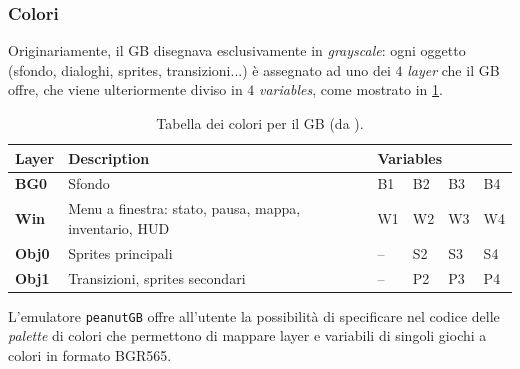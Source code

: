 \documentclass[hidelinks,12pt]{article}
\begin{document}
\subsubsection{Colori}
Originariamente, il GB disegnava esclusivamente in \textit{grayscale}: ogni
oggetto (sfondo, dialoghi, sprites, transizioni...) è assegnato ad uno dei $4$
\textit{layer} che il GB offre, che viene ulteriormente diviso in $4$
\textit{variables}, come mostrato in \cref{table:gb_colors}.
\begin{table}[h]
	\begin{tabular}{|l|l|llll|}
		\hline
		\textbf{Layer} & \textbf{Description}                                  & \multicolumn{4}{l|}{\textbf{Variables}}                                                          \\ \hline
		\textbf{BG0}   & Sfondo                                                & \multicolumn{1}{l|}{B1}                 & \multicolumn{1}{l|}{B2} & \multicolumn{1}{l|}{B3} & B4 \\ \hline
		\textbf{Win}   & Menu a finestra: stato, pausa, mappa, inventario, HUD & \multicolumn{1}{l|}{W1}                 & \multicolumn{1}{l|}{W2} & \multicolumn{1}{l|}{W3} & W4 \\ \hline
		\textbf{Obj0}  & Sprites principali                                    & \multicolumn{1}{l|}{–}                  & \multicolumn{1}{l|}{S2} & \multicolumn{1}{l|}{S3} & S4 \\ \hline
		\textbf{Obj1}  & Transizioni, sprites secondari                        & \multicolumn{1}{l|}{–}                  & \multicolumn{1}{l|}{P2} & \multicolumn{1}{l|}{P3} & P4 \\ \hline
	\end{tabular}
	\caption{Tabella dei colori per il GB (da
		\cite{GameBoyColors}).}
	\label{table:gb_colors}
\end{table}
L'emulatore \texttt{peanutGB} offre all'utente la possibilità di specificare nel
codice delle \textit{palette} di colori che permettono di mappare layer e
variabili di singoli giochi a colori in formato BGR565.
\end{document}
